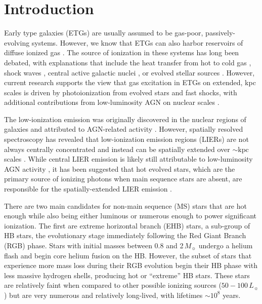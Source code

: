 \documentclass[preprint2]{aastex62}
\newcommand\Lsun{\ensuremath{\,L_{\sun}}\xspace}
\newcommand\Msun{\ensuremath{\,M_{\sun}}\xspace}
\begin{document}
\section{Introduction} \label{sec:intro}

Early type galaxies (ETGs) are usually assumed to be gas-poor, passively-evolving systems. However, we know that ETGs can also harbor reservoirs of diffuse ionized gas \citep[e.g.,][]{Sarzi+2006, Singh+2013, Kehrig+2012, Papaderos+2013}. The source of ionization in these systems has long been debated, with explanations that include the heat transfer from hot to cold gas \citep{Heckman+1981}, shock waves \citep{Koski+1976, Dopita+1995, Allen+2008}, central active galactic nuclei \citep[AGN; ][]{Ferland+1983, Halpern+1983, Heckman+1998, Ho+1999, Kauffmann+2003b, Kewley+2006, Ho+2009}, or evolved stellar sources \citep{Binette+1994, Taniguchi+2000}. However, current research supports the view that gas excitation in ETGs on extended, kpc scales is driven by photoionization from evolved stars and fast shocks, with additional contributions from low-luminosity AGN on nuclear scales \citep[e.g., ][]{Pandya+2017}.

The low-ionization emission was originally discovered in the nuclear regions of galaxies and attributed to AGN-related activity \citep[for a recent review, see][]{Filippenko+2003}. However, spatially resolved spectroscopy has revealed that low-ionization emission regions (LIERs) are not always centrally concentrated and instead can be spatially extended over ${\sim}\mathrm{kpc}$ scales \citep{Goudfrooij+1994, Maccehetto+1996, Sharp+2010, Kehrig+2012, Papaderos+2013, Singh+2013, James+2015, Belfiore+2016, Gomes+2016}. While central LIER emission is likely still attributable to low-luminosity AGN activity \citep[e.g.,][]{Kormendy+2013}, it has been suggested that hot evolved stars, which are the primary source of ionizing photons when main sequence stars are absent, are responsible for the spatially-extended LIER emission \citep{Binette+1994, Stasinska+2008, Sarzi+2010, Yan+2012, Woods+2014, Johansson+2016}.

There are two main candidates for non-main sequence (MS) stars that are hot enough while also being either luminous or numerous enough to power significant ionization. The first are extreme horizontal branch (EHB) stars, a sub-group of HB stars, the evolutionary stage immediately following the Red Giant Branch (RGB) phase. Stars with initial masses between 0.8 and 2\Msun undergo a helium flash and begin core helium fusion on the HB. However, the subset of stars that experience more mass loss during their RGB evolution begin their HB phase with less massive hydrogen shells, producing hot or ``extreme'' HB stars. These stars are relatively faint when compared to other possible ionizing sources ($50-100$\Lsun) but are very numerous and relatively long-lived, with lifetimes $\sim 10^8$ years. 
\end{document}
